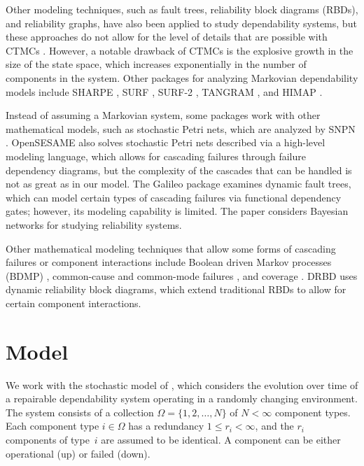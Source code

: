 \documentclass[12pt]{article}
\begin{document}
Other modeling techniques,
such as fault trees, reliability
block diagrams (RBDs), and reliability graphs,
have also been applied to study
dependability systems, but these
approaches do not allow for
the level of details that are
possible with CTMCs \cite{MFT:2000}.
However,
a notable drawback of CTMCs is the
explosive growth in the size of the
state space, which increases exponentially
in the number of components in the system.
Other packages for analyzing Markovian
dependability models include
SHARPE \cite{STP:1996},
SURF \cite{Butl:1986},
SURF-2 \cite{SURF2:1993},
TANGRAM \cite{BSM:1991},
and HIMAP \cite{KGS:1996}.

Instead of assuming a Markovian
system, some packages work with
other mathematical models, such as
stochastic Petri nets,
which are analyzed by SNPN
\cite{HTT:2000}.
OpenSESAME \cite{WSB:2008}
also solves stochastic Petri nets
described via a high-level
modeling language, which allows
for cascading failures through
failure dependency diagrams,
but the complexity of the
cascades that can be handled is
not as great as in our model.
The Galileo package
\cite{SDC:1999}
examines dynamic fault trees,
which can model certain types
of cascading failures via
functional dependency gates;
however, its modeling capability
is limited.
The paper \cite{LaPo:2007}
considers Bayesian networks
for studying reliability systems.

Other mathematical modeling techniques
that allow some forms of cascading
failures or component interactions
include Boolean driven
Markov processes (BDMP)
\cite{BoBo:2003},
common-cause and common-mode failures
\cite{ALRL:2004,BCS:1969},
and coverage
\cite{DuTr:1989}.
DRBD \cite{XXR:2009} uses
dynamic reliability block diagrams,
which extend traditional RBDs
to allow for certain component
interactions.

\section{Model}
\label{sec:model}

We work with the stochastic model of \cite{ING:2009}, which considers the
evolution over time of a repairable dependability system operating in a randomly
changing environment. The system consists of a collection $\Omega = \{ 1, 2,
\ldots, N \}$ of $N < \infty$ component types. Each component type $i \in
\Omega$ has a redundancy $1 \leq r_i < \infty$, and the $r_i$ components of
type~$i$ are assumed to be identical. A component can be either operational (up)
or failed (down).
\end{document}
